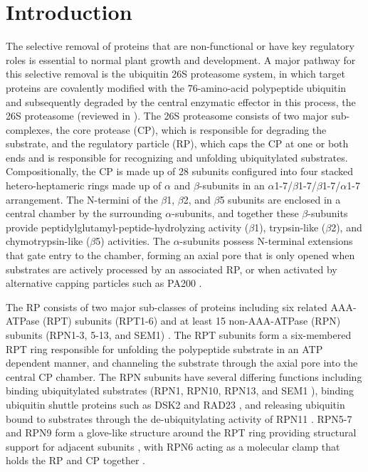 \section{Introduction}
	The selective removal of proteins that are non-functional or have key regulatory roles is essential to normal plant growth and development. A major pathway for this selective removal is the ubiquitin 26S proteasome system, in which target proteins are covalently modified with the 76-amino-acid polypeptide ubiquitin and subsequently degraded by the central enzymatic effector in this process, the 26S proteasome (reviewed in \citep{finley09, livneh16, vierstra09}). The 26S proteasome consists of two major sub-complexes, the core protease (CP), which is responsible for degrading the substrate, and the regulatory particle (RP), which caps the CP at one or both ends and is responsible for recognizing and unfolding ubiquitylated substrates. Compositionally, the CP is made up of 28 subunits configured into four stacked hetero-heptameric rings made up of $\alpha$ and $\beta$-subunits in an $\alpha$1-7/$\beta$1-7/$\beta$1-7/$\alpha$1-7 arrangement. The N-termini of the $\beta$1, $\beta$2, and $\beta$5 subunits are enclosed in a central chamber by the surrounding $\alpha$-subunits, and together these $\beta$-subunits provide peptidylglutamyl-peptide-hydrolyzing activity ($\beta$1), trypsin-like ($\beta$2), and chymotrypsin-like ($\beta$5) activities. The $\alpha$-subunits possess N-terminal extensions that gate entry to the chamber, forming an axial pore that is only opened when substrates are actively processed by an associated RP, or when activated by alternative capping particles such as PA200 \citep{dange11, sadre-bazzaz10}.
	
The RP consists of two major sub-classes of proteins including six related AAA-ATPase (RPT) subunits (RPT1-6) and at least 15 non-AAA-ATPase (RPN) subunits (RPN1-3, 5-13, and SEM1) \citep{finley09, paraskevopoulos14, russell13}. The RPT subunits form a six-membered RPT ring responsible for unfolding the polypeptide substrate in an ATP dependent manner, and channeling the substrate through the axial pore into the central CP chamber. The RPN subunits have several differing functions including binding ubiquitylated substrates (RPN1, RPN10, RPN13, and SEM1 \citep{elsasser04, paraskevopoulos14, schreiner08, shi16}), binding ubiquitin shuttle proteins such as DSK2 and RAD23 \citep{elsasser02, farmer10, fatimababy10, lin11}, and releasing ubiquitin bound to substrates through the de-ubiquitylating activity of RPN11 \citep{verma02, yao02}.  RPN5-7 and RPN9 form a glove-like structure around the RPT ring providing structural support for adjacent subunits \citep{lander12, lasker12, unverdorben14}, with RPN6 acting as a molecular clamp that holds the RP and CP together \citep{pathare12}.


